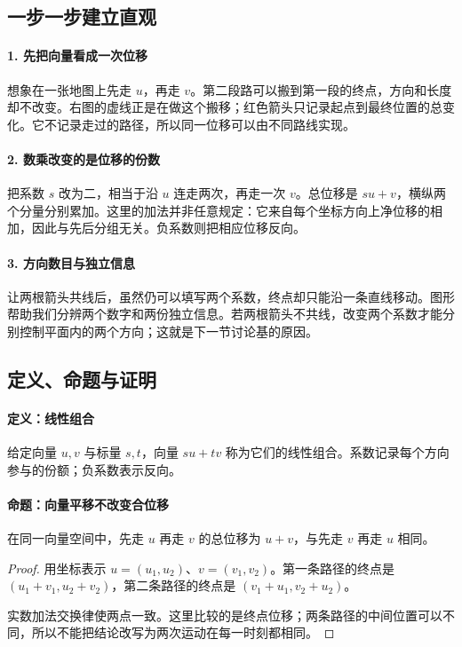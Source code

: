 \subsection*{一步一步建立直观}

\paragraph{1. 先把向量看成一次位移}

想象在一张地图上先走 $u$，再走 $v$。第二段路可以搬到第一段的终点，方向和长度却不改变。右图的虚线正是在做这个搬移；红色箭头只记录起点到最终位置的总变化。它不记录走过的路径，所以同一位移可以由不同路线实现。



\paragraph{2. 数乘改变的是位移的份数}

把系数 $s$ 改为二，相当于沿 $u$ 连走两次，再走一次 $v$。总位移是 $su+v$，横纵两个分量分别累加。这里的加法并非任意规定：它来自每个坐标方向上净位移的相加，因此与先后分组无关。负系数则把相应位移反向。



\paragraph{3. 方向数目与独立信息}

让两根箭头共线后，虽然仍可以填写两个系数，终点却只能沿一条直线移动。图形帮助我们分辨两个数字和两份独立信息。若两根箭头不共线，改变两个系数才能分别控制平面内的两个方向；这就是下一节讨论基的原因。



\subsection*{定义、命题与证明}

\paragraph{定义：线性组合}

给定向量 $u,v$ 与标量 $s,t$，向量 $su+tv$ 称为它们的线性组合。系数记录每个方向参与的份额；负系数表示反向。

\paragraph{命题：向量平移不改变合位移}

在同一向量空间中，先走 $u$ 再走 $v$ 的总位移为 $u+v$，与先走 $v$ 再走 $u$ 相同。

\begin{proof}

用坐标表示 $u=(u_1,u_2)$、$v=(v_1,v_2)$。第一条路径的终点是 $(u_1+v_1,u_2+v_2)$，第二条路径的终点是 $(v_1+u_1,v_2+u_2)$。

实数加法交换律使两点一致。这里比较的是终点位移；两条路径的中间位置可以不同，所以不能把结论改写为两次运动在每一时刻都相同。

\end{proof}
